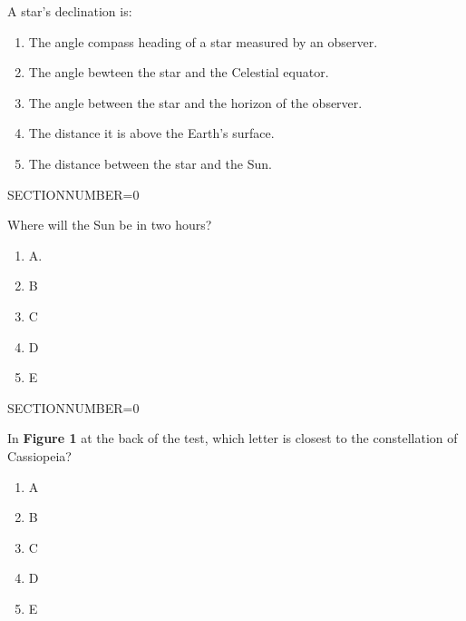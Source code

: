 \documentclass[11pt]{article}
\begin{document}
\begin{enumerate}
\begin{minipage}{\textwidth}
\begin{minipage}{\textwidth}
\item A star's declination is:
\begin{enumerate} 
\setlength{\itemsep}{1pt} 
\setlength{\parskip}{0pt} 
\setlength{\parsep}{0pt}
\setlength{\multicolsep}{1pt} 
\item The angle compass heading of a star measured by an observer.
\item The angle bewteen the star and the Celestial equator.
\item The angle between the star and the horizon of the observer.
\item The distance it is above the Earth's surface.
\item The distance between the star and the Sun.
\end{enumerate} 
\end{minipage}
SECTIONNUMBER=0
\end{minipage}
\vskip 0.20in

\begin{minipage}{\textwidth}
\begin{minipage}{\textwidth}
\item Where will the Sun be in two hours?
\begin{multicols}{3}
\begin{enumerate} 
\setlength{\itemsep}{1pt} 
\setlength{\parskip}{0pt} 
\setlength{\parsep}{0pt}
\setlength{\multicolsep}{1pt} 
\item A.
\item B
\item C
\item D
\item E
\end{enumerate} 
\vfill 
\end{multicols}

\end{minipage}
SECTIONNUMBER=0
\end{minipage}
\vskip 0.20in

\begin{minipage}{\textwidth}
\begin{minipage}{\textwidth}
\item In {\bf Figure 1} at the back of the test, which letter is closest to the constellation of  Cassiopeia?
\begin{multicols}{3}
\begin{enumerate} 
\setlength{\itemsep}{1pt} 
\setlength{\parskip}{0pt} 
\setlength{\parsep}{0pt}
\setlength{\multicolsep}{1pt} 
\item A
\item B
\item C
\item D
\item E
\end{enumerate} 
\vfill 
\end{multicols}


\end{minipage}
\end{minipage}
\end{enumerate}
\end{document}
